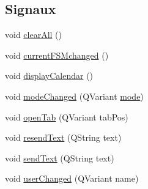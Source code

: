 \subsection*{Signaux}
\begin{DoxyCompactItemize}
\item 
void \hyperlink{classSH__ApplicationCore_ab03fe18921573a2566d587189173f691}{clear\-All} ()
\item 
void \hyperlink{classSH__ApplicationCore_aac0f404ccc6443d1ddaf9b25dda14416}{current\-F\-S\-Mchanged} ()
\item 
void \hyperlink{classSH__ApplicationCore_acb00dec6d5cc096ca99e8d0235dd8095}{display\-Calendar} ()
\item 
void \hyperlink{classSH__ApplicationCore_ad9ef4e541ba77120b8f1b5f71bbfe717}{mode\-Changed} (Q\-Variant \hyperlink{classSH__ApplicationCore_a5d9ecb0e578e78d84591e36dccdf3d07}{mode})
\item 
void \hyperlink{classSH__ApplicationCore_a1ca7706a2414bcfba6d529f0216dec8f}{open\-Tab} (Q\-Variant tab\-Pos)
\item 
void \hyperlink{classSH__ApplicationCore_a83dbcb859d0d31a6487086150e430d6b}{resend\-Text} (Q\-String text)
\item 
void \hyperlink{classSH__ApplicationCore_aeaf9c78e68e7f55564f75e07d0f327aa}{send\-Text} (Q\-String text)
\item 
void \hyperlink{classSH__ApplicationCore_aeeac6cde618cb677218d72c4ea7ecf18}{user\-Changed} (Q\-Variant name)
\end{DoxyCompactItemize}
